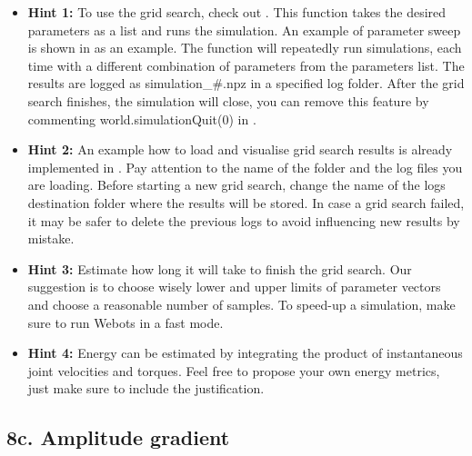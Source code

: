 \documentclass{cmc}
\begin{document}
\begin{itemize}
\item \textbf{Hint 1:} To use the grid search, check out
  . This function takes the desired
  parameters as a list and runs the simulation. An example of parameter sweep is
  shown in  as an example. The function will
  repeatedly run simulations, each time with a different combination of
  parameters from the parameters list. The results are logged as
  simulation\_\#.npz in a specified log folder. After the grid search finishes,
  the simulation will close, you can remove this feature by commenting
  world.simulationQuit(0) in .
\item \textbf{Hint 2:} An example how to load and visualise grid search results
  is already implemented in . Pay attention to
  the name of the folder and the log files you are loading. Before starting a
  new grid search, change the name of the logs destination folder where the
  results will be stored. In case a grid search failed, it may be safer to
  delete the previous logs to avoid influencing new results by mistake.
\item \textbf{Hint 3:} Estimate how long it will take to finish the grid
  search. Our suggestion is to choose wisely lower and upper limits of parameter
  vectors and choose a reasonable number of samples. To speed-up a simulation,
  make sure to run Webots in a fast mode.
\item \textbf{Hint 4:} Energy can be estimated by integrating the product of
  instantaneous joint velocities and torques. Feel free to propose your own
  energy metrics, just make sure to include the justification.
\end{itemize}


\subsection*{8c. Amplitude gradient}
\label{sec:amplitude-gradient}
\end{document}
